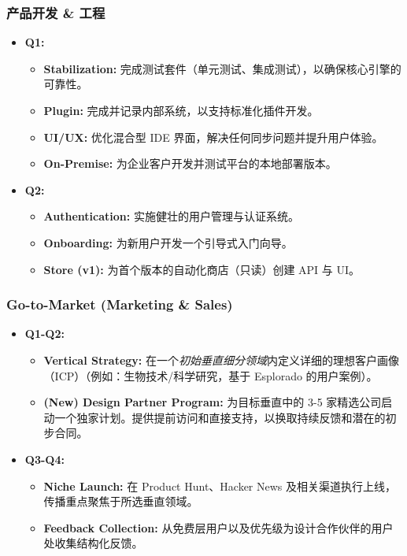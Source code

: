 \documentclass[11pt, a4paper, oneside]{article}
\begin{document}
\subsubsection{产品开发 \& 工程}
\begin{itemize}[leftmargin=*]
    \item \textbf{Q1:}
    \begin{itemize}
        \item \textbf{Stabilization:} 完成测试套件（单元测试、集成测试），以确保核心引擎的可靠性。
        \item \textbf{Plugin:} 完成并记录内部系统，以支持标准化插件开发。
        \item \textbf{UI/UX:} 优化混合型 IDE 界面，解决任何同步问题并提升用户体验。
        \item \textbf{On-Premise:} 为企业客户开发并测试平台的本地部署版本。
    \end{itemize}
    \item \textbf{Q2:}
    \begin{itemize}
        \item \textbf{Authentication:} 实施健壮的用户管理与认证系统。
        \item \textbf{Onboarding:} 为新用户开发一个引导式入门向导。
        \item \textbf{Store (v1):} 为首个版本的自动化商店（只读）创建 API 与 UI。
    \end{itemize}
\end{itemize}

\subsubsection{Go-to-Market (Marketing \& Sales)}
\begin{itemize}[leftmargin=*]
    \item \textbf{Q1-Q2:}
    \begin{itemize}
        \item \textbf{Vertical Strategy:} 在一个\textit{初始垂直细分领域}内定义详细的理想客户画像（ICP）（例如：生物技术/科学研究，基于 Esplorado 的用户案例）。
        \item \textbf{(New) Design Partner Program:} 为目标垂直中的 3-5 家精选公司启动一个独家计划。提供提前访问和直接支持，以换取持续反馈和潜在的初步合同。
    \end{itemize}
    \item \textbf{Q3-Q4:}
    \begin{itemize}
        \item \textbf{Niche Launch:} 在 Product Hunt、Hacker News 及相关渠道执行上线，传播重点聚焦于所选垂直领域。
        \item \textbf{Feedback Collection:} 从免费层用户以及优先级为设计合作伙伴的用户处收集结构化反馈。
    \end{itemize}
\end{itemize}
\end{document}
